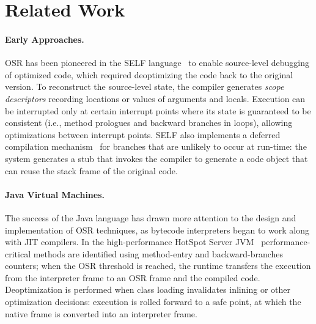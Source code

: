 \section{Related Work}
\label{se:related}

\paragraph{Early Approaches.}

OSR has been pioneered in the SELF language~\cite{holzle1992self} to enable source-level debugging of optimized code, which required deoptimizing the code back to the original version. To reconstruct the source-level state, the compiler generates {\em scope descriptors} recording locations or values of arguments and locals. Execution can be interrupted only at certain interrupt points where its state is guaranteed to be consistent (i.e., method prologues and backward branches in loops), allowing optimizations between interrupt points. SELF also implements a deferred compilation mechanism~\cite{chambers1991self} for branches that are unlikely to occur at run-time: the system generates a stub that invokes the compiler to generate a code object that can reuse the stack frame of the original code.

\paragraph{Java Virtual Machines.}
The success of the Java language has drawn more attention to the design and implementation of OSR techniques, as bytecode interpreters began to work along with JIT compilers. In the high-performance HotSpot Server JVM~\cite{paleczny2001hotspot} performance-critical methods are identified using method-entry and backward-branches counters; when the OSR threshold is reached, the runtime transfers the execution from the interpreter frame to an OSR frame and the compiled code. Deoptimization is performed when class loading invalidates inlining or other optimization decisions: execution is rolled forward to a safe point, at which the native frame is converted into an interpreter frame.

